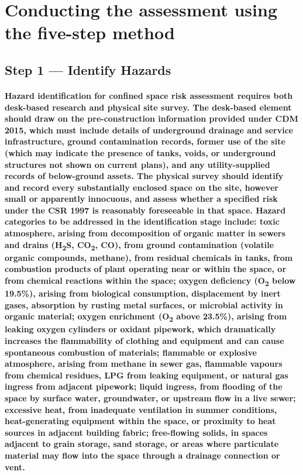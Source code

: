\section{Conducting the assessment using the five-step method}

\subsection{Step 1 --- Identify Hazards}
\paragraph{Hazard identification for confined space risk assessment requires both desk-based research and physical site survey. The desk-based element should draw on the pre-construction information provided under CDM 2015, which must include details of underground drainage and service infrastructure, ground contamination records, former use of the site (which may indicate the presence of tanks, voids, or underground structures not shown on current plans), and any utility-supplied records of below-ground assets. The physical survey should identify and record every substantially enclosed space on the site, however small or apparently innocuous, and assess whether a specified risk under the CSR 1997 is reasonably foreseeable in that space. Hazard categories to be addressed in the identification stage include: toxic atmosphere, arising from decomposition of organic matter in sewers and drains (H\textsubscript{2}S, CO\textsubscript{2}, CO), from ground contamination (volatile organic compounds, methane), from residual chemicals in tanks, from combustion products of plant operating near or within the space, or from chemical reactions within the space; oxygen deficiency (O\textsubscript{2} below 19.5\%), arising from biological consumption, displacement by inert gases, absorption by rusting metal surfaces, or microbial activity in organic material; oxygen enrichment (O\textsubscript{2} above 23.5\%), arising from leaking oxygen cylinders or oxidant pipework, which dramatically increases the flammability of clothing and equipment and can cause spontaneous combustion of materials; flammable or explosive atmosphere, arising from methane in sewer gas, flammable vapours from chemical residues, LPG from leaking equipment, or natural gas ingress from adjacent pipework; liquid ingress, from flooding of the space by surface water, groundwater, or upstream flow in a live sewer; excessive heat, from inadequate ventilation in summer conditions, heat-generating equipment within the space, or proximity to heat sources in adjacent building fabric; free-flowing solids, in spaces adjacent to grain storage, sand storage, or areas where particulate material may flow into the space through a drainage connection or vent.}


